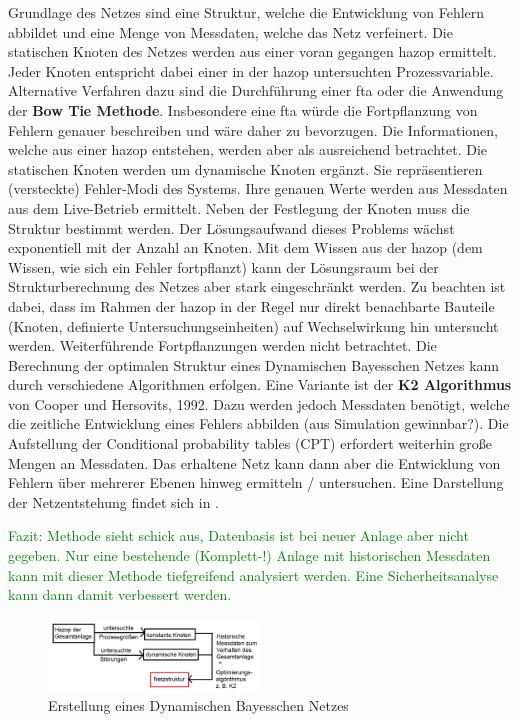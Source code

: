 Grundlage des Netzes sind eine Struktur, welche die Entwicklung von Fehlern abbildet und eine Menge von Messdaten, welche das Netz verfeinert. \linebreak
 Die statischen Knoten des Netzes werden aus einer voran gegangen \ac{hazop} ermittelt. Jeder Knoten entspricht dabei einer in der \ac{hazop} untersuchten Prozessvariable. Alternative Verfahren dazu sind die Durchf\"uhrung einer \ac{fta} oder die Anwendung der \textbf{Bow Tie Methode}. Insbesondere eine \ac{fta} w\"urde die Fortpflanzung von Fehlern genauer beschreiben und w\"are daher zu bevorzugen. Die Informationen, welche aus einer \ac{hazop} entstehen, werden aber als ausreichend betrachtet. Die statischen Knoten werden um dynamische Knoten erg\"anzt. Sie repr\"asentieren (versteckte) Fehler-Modi des Systems. Ihre genauen Werte werden aus Messdaten aus dem Live-Betrieb ermittelt.  \linebreak
Neben der Festlegung der Knoten muss die Struktur bestimmt werden. Der L\"osungsaufwand dieses Problems w\"achst exponentiell mit der Anzahl an Knoten. Mit dem Wissen aus der \ac{hazop} (dem Wissen, wie sich ein Fehler fortpflanzt) kann der L\"osungsraum bei der Strukturberechnung des Netzes aber stark eingeschr\"ankt werden. Zu beachten ist dabei, dass im Rahmen der \ac{hazop} in der Regel nur direkt benachbarte Bauteile (Knoten, definierte Untersuchungseinheiten) auf Wechselwirkung hin untersucht werden. Weiterf\"uhrende Fortpflanzungen werden nicht betrachtet.  Die Berechnung der optimalen Struktur eines Dynamischen Bayesschen Netzes kann durch verschiedene Algorithmen erfolgen. Eine Variante ist der \textbf{K2 Algorithmus} von Cooper und Hersovits, 1992. Dazu werden jedoch Messdaten ben\"otigt, welche die zeitliche Entwicklung eines Fehlers abbilden (aus Simulation gewinnbar?). Die Aufstellung der Conditional probability tables (CPT) erfordert weiterhin gro\ss{}e Mengen an Messdaten. Das erhaltene Netz kann dann aber die Entwicklung von Fehlern \"uber mehrerer Ebenen hinweg ermitteln / untersuchen. Eine Darstellung der Netzentstehung findet sich in . 

\textcolor{green}{Fazit: Methode sieht schick aus, Datenbasis ist bei neuer Anlage aber nicht gegeben. Nur eine bestehende (Komplett-!) Anlage mit historischen Messdaten kann mit dieser Methode tiefgreifend analysiert werden. Eine Sicherheitsanalyse kann dann damit verbessert werden.} 

\begin{figure}[h!tb]
\begin{center}
\includegraphics[width=0.5\textwidth]{bilder/Hu_2015_Netzentstehung.png}
\caption{Erstellung eines Dynamischen Bayesschen Netzes}
\label{fig:Hu_2015_netzentstehung}
\end{center}
\end{figure}

